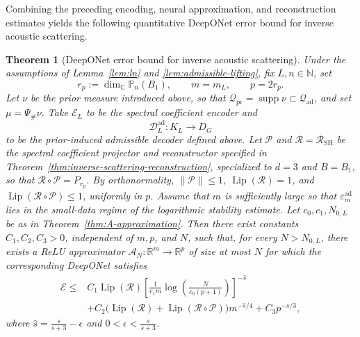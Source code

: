 \documentclass{article}
\numberwithin{equation}{section}
\theoremstyle{plain}
\newtheorem{theorem}{Theorem}[section]
\newcommand{\Lip}{\operatorname{Lip}}
\begin{document}
    Combining the preceding encoding, neural approximation, and reconstruction estimates yields the following quantitative DeepONet error bound for inverse acoustic scattering.
	\begin{theorem}[DeepONet error bound for inverse acoustic scattering]
	\label{thm:main}
	Under the assumptions of Lemma~\ref{lem:ln} and
	\ref{lem:admissible-lifting}, fix $L,n\in\mathbb N$, set
	\begin{equation*}
		r_p:=\dim_{\mathbb C}\mathbb P_n(B_1),
		\qquad
		m=m_L,
		\qquad
		p=2r_p.
	\end{equation*}
	Let $\nu$ be the prior measure introduced above, so that
	$\mathcal Q_{\mathrm{pr}}=\operatorname{supp}\nu
	\subset\mathcal Q_{\mathrm{ad}}$, and set
	$\mu=\Psi_{\#}\nu$. Take $\mathcal E_L$ to be the spectral coefficient encoder and
	\begin{equation*}
		\mathcal D_L^{\mathrm{ad}}:K_L\to D_G
	\end{equation*}
	to be the prior-induced admissible decoder defined above.
		Let $\mathcal P$ and $\mathcal R=\mathcal R_{\mathrm{SH}}$ be the
		spectral coefficient projector and reconstructor specified in
		Theorem~\ref{thm:inverse-scattering-reconstruction}, specialized
		to $d=3$ and $B=B_1$, so that $\mathcal R\circ\mathcal P=P_{r_p}$.
		By orthonormality,
		$\|\mathcal P\|\le 1$, $\Lip(\mathcal R)=1$, and
		$\Lip(\mathcal R\circ\mathcal P)\le 1$, uniformly in $p$.
	Assume that $m$ is sufficiently large so that $\varepsilon_m^{\mathrm{ad}}$ lies in the small-data regime of the logarithmic stability estimate. Let $c_0,c_1,N_{0,L}$ be as in Theorem~\ref{thm:A-approximation}. Then there exist constants $C_1,C_2,C_3>0$, independent of $m,p$, and $N$, such that, for every $N>N_{0,L}$, there exists a ReLU approximator $\mathcal A_N:\mathbb R^m\to\mathbb R^p$ of size at most $N$ for which the corresponding DeepONet satisfies
	\begin{equation}\label{eq:inverse-scattering-error}
	\begin{aligned}
	\mathscr E
	\le{}&
	C_1\Lip(\mathcal R)
	\left[
	\frac{1}{c_1m}
	\log\!\left(\frac{N}{c_0(p+1)}\right)
	\right]^{-\hat s}\\
	&+C_2\bigl(\Lip(\mathcal R)+\Lip(\mathcal R\circ\mathcal P)\bigr)m^{-\hat s/4}
	+C_3p^{-s/3},
	\end{aligned}
	\end{equation}
	where $\hat s=\frac{s}{s+3}-\epsilon$ and $0<\epsilon<\frac{s}{s+3}$.
	\end{theorem}
\end{document}
